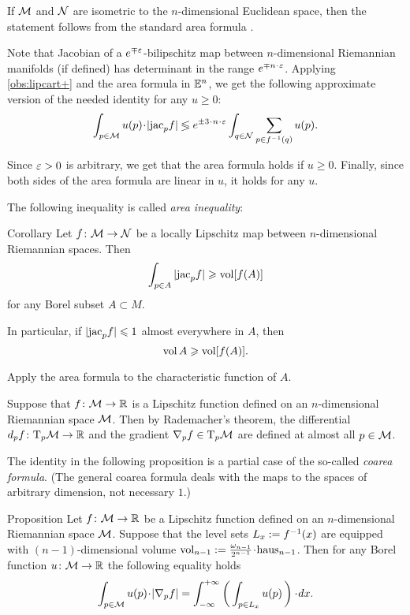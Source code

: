 If $\mathcal{M}$ and $\mathcal{N}$ are isometric to the $n$-dimensional Euclidean space, then the statement follows from the standard area formula \cite[3.2.3]{federer}.

Note that Jacobian of a $e^{\mp\varepsilon}$-bilipschitz map between $n$-dimensional Riemannian manifolds (if defined) has determinant in the range $e^{\mp n\cdot\eps}$.
Applying \ref{obs:lipcart+} and the area formula in $\mathbb{E}^n$, we get the following approximate version of the needed identity for any $u\ge0$: 
\[\int_{p\in \spc{M}} u(p)\cdot |\jac_pf|
\lege e^{\pm 3\cdot n\cdot \eps}\int_{q\in \spc{N}}\sum_{p\in f^{-1}(q)} u(p).\]

Since $\varepsilon>0$ is arbitrary, we get that the area formula holds if $u\ge 0$.
Finally, since both sides of the area formula are linear in $u$, it holds for any $u$.
\qeds

The following inequality is called \emph{area inequality}:

\begin{thm}{Corollary}\label{cor:area-inequality}
Let $f\colon\mathcal{M}\to\mathcal{N}$ be a locally Lipschitz map between $n$-dimensional Riemannian spaces.
Then 
\[\int_{p\in A} |\mathrm{jac}_p f|\geqslant \operatorname{\rm vol}\nolimits[f(A)]\]
for any Borel subset $A\subset M$.

In particular, if $|\mathrm{jac}_p f|\leqslant 1$ almost everywhere in $A$, then 
\[\operatorname{\rm vol}\nolimits A \geqslant \operatorname{\rm vol}\nolimits[f(A)].\]
\end{thm}

 Apply the area formula to the characteristic function of $A$.
\qeds

Suppose that $f\colon\mathcal{M}\to\mathbb{R}$ is a Lipschitz function defined on an $n$-dimensional Riemannian space $\mathcal{M}$.
Then by Rademacher's theorem, the differential $d_pf\colon\mathrm{T}_p\mathcal{M}\to\mathbb{R}$  and the gradient 
$\nabla_pf\in\mathrm{T}_p\mathcal{M}$ are defined at almost all $p\in \mathcal{M}$.

The identity in the following proposition is a partial case of the so-called \emph{coarea formula}.
(The general coarea formula deals with the maps to the spaces of arbitrary dimension, not necessary $1$.)


\begin{thm}{Proposition}\label{prop:coarea}
Let $f\colon\mathcal{M}\to\mathbb{R}$ be a Lipschitz function defined on an $n$-dimensional Riemannian space $\mathcal{M}$.
Suppose that the level sets $L_x\mathrel{:=} f^{-1}(x)$ are equipped with $(n-1)$-dimensional volume $\vol_{n-1}\z\df\tfrac{\omega_{n-1}}{2^{n-1}}\cdot \haus_{n-1}$.
Then for any Borel function $u\colon\mathcal{M}\to \mathbb{R}$ the following equality holds
\[\int_{p\in \spc{M}} u(p)\cdot |\nabla_pf|=\int_{-\infty}^{+\infty} \left(\,\int_{p\in L_x} u(p)\,\right)\cdot dx.\]
\end{thm}

